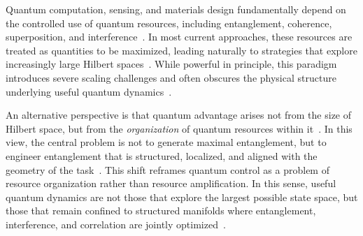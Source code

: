 \documentclass[twocolumn,10pt]{article}
\begin{document}

Quantum computation, sensing, and materials design fundamentally depend on the controlled use of quantum resources, including entanglement, coherence, superposition, and interference~\cite{NielsenChuang,Horodecki2009,Streltsov2017}. In most current approaches, these resources are treated as quantities to be maximized, leading naturally to strategies that explore increasingly large Hilbert spaces~\cite{Preskill2018,Arute2019}. While powerful in principle, this paradigm introduces severe scaling challenges and often obscures the physical structure underlying useful quantum dynamics~\cite{Eisert2010,Altman2015}.

An alternative perspective is that quantum advantage arises not from the size of Hilbert space, but from the \emph{organization} of quantum resources within it~\cite{Amico2008,Swingle2018}. In this view, the central problem is not to generate maximal entanglement, but to engineer entanglement that is structured, localized, and aligned with the geometry of the task~\cite{Verstraete2008,Orus2014}. This shift reframes quantum control as a problem of resource organization rather than resource amplification. In this sense, useful quantum dynamics are not those that explore the largest possible state space, but those that remain confined to structured manifolds where entanglement, interference, and correlation are jointly optimized~\cite{KimHuse2013,Choi2016}.

\end{document}
